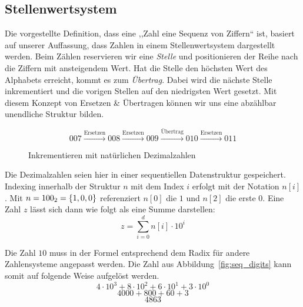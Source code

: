\subsection{Stellenwertsystem}
%
Die vorgestellte Definition, dass eine ,,Zahl eine Sequenz von Ziffern`` ist,
basiert auf unserer Auffassung, dass Zahlen in einem Stellenwertsystem
dargestellt werden. Beim Zählen reservieren wir eine \emph{Stelle} und
positionieren der Reihe nach die Ziffern mit ansteigendem Wert.
Hat die Stelle den höchsten Wert des Alphabets erreicht,
kommt es zum \emph{Übertrag}. Dabei wird die nächste Stelle inkrementiert
und die vorigen Stellen auf den niedrigsten Wert gesetzt.
Mit diesem Konzept von Ersetzen \& Übertragen
können wir uns eine abzählbar unendliche Struktur bilden.
%
\begin{figure}[ht]
  \begin{displaymath}
    007 \xrightarrow{\text{Ersetzen}} 008 \xrightarrow{\text{Ersetzen}}
    009 \xrightarrow{\text{Übertrag}} 010 \xrightarrow{\text{Ersetzen}}
    011
  \end{displaymath}

  \caption{Inkrementieren mit natürlichen Dezimalzahlen}
\end{figure}

Die Dezimalzahlen seien hier in einer sequentiellen Datenstruktur gespeichert.
Indexing innerhalb der Struktur $n$ mit dem Index $i$ erfolgt mit der Notation
$n[i]$. Mit $n = 100_2 = \left\{1, 0, 0\right\}$ referenziert $n[0]$ die $1$ und
$n[2]$ die erste $0$. Eine Zahl $z$ lässt sich dann wie folgt als eine Summe
darstellen:
\[
  z = \sum_{i=0}^d n[i] \cdot 10^i
\]

Die Zahl $10$ muss in der Formel entsprechend dem Radix für andere
Zahlensysteme angepasst werden. Die Zahl aus Abbildung~\ref{fig:seq_digits}
kann somit auf folgende Weise aufgelöst werden.
\[
  4\cdot10^3 + 8\cdot10^2 + 6\cdot10^1 + 3\cdot10^0
\] \[
  4000 + 800 + 60 + 3
\] \[
  4863
\]

